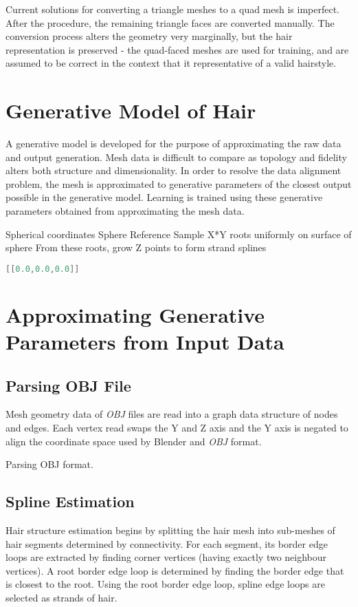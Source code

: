 \documentclass[ %
                    author={Dillon Keith Diep [INCOMPLETE DRAFT, NOT FOR SUBMISSION]},
                supervisor={Dr. Carl Henrik Ek},
                    degree={MEng},
                     title={ARt-CG:},
                  subtitle={Assisted Real-time Content Generation of 3D Hair by Learning Manifolds},
                      type={Research},
                      year={2014} ]{dissertation}
\begin{document}
Current solutions for converting a triangle meshes to a quad mesh is imperfect. After the procedure, the remaining triangle faces are converted manually. The conversion process alters the geometry very marginally, but the hair representation is preserved - the quad-faced meshes are used for training, and are assumed to be correct in the context that it representative of a valid hairstyle.

\section{Generative Model of Hair}
A generative model is developed for the purpose of approximating the raw data and output generation. Mesh data is difficult to compare as topology and fidelity alters both structure and dimensionality. In order to resolve the data alignment problem, the mesh is approximated to generative parameters of the closest output possible in the generative model. Learning is trained using these generative parameters obtained from approximating the mesh data. 

Spherical coordinates
Sphere Reference
Sample X*Y roots uniformly on surface of sphere
From these roots, grow Z points to form strand splines

\begin{lstlisting}[float={!h},caption={Generative Hair Parameter Format.},label={aa},language=C]
[[0.0,0.0,0.0]]
\end{lstlisting}

\section{Approximating Generative Parameters from Input Data}
\subsection{Parsing OBJ File}
Mesh geometry data of \textit{OBJ} files are read into a graph data structure of nodes and edges. Each vertex read swaps the Y and Z axis and the Y axis is negated to align the coordinate space used by Blender and \textit{OBJ} format.

\begin{algorithm}[!h]
	\caption{Parsing OBJ format.}
	\label{alg}
\end{algorithm}

\subsection{Spline Estimation}
Hair structure estimation begins by splitting the hair mesh into sub-meshes of hair segments determined by connectivity. For each segment, its border edge loops are extracted by finding corner vertices (having exactly two neighbour vertices). A root border edge loop is determined by finding the border edge that is closest to the root. Using the root border edge loop, spline edge loops are selected as strands of hair.
\end{document}
